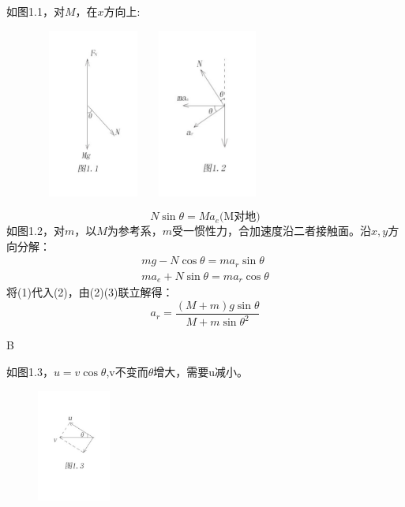 \documentclass[b5paper,opensource,sourcefont,parskip]{qyxf-book}
\begin{document}
\solve 如图1.1，对$M$，在$x$方向上:
\begin{figure}[htbp]
	\centering
	\includegraphics[width=10em,height=15em]{Chp1_illus1.png}
	\quad
	\centering
	\includegraphics[width=10em,height=15em]{Chp1_illus2.png}
\end{figure}
\begin{equation}
N\sin\theta=Ma_e\text{(M对地)}
\end{equation}
如图1.2，对$m$，以$M$为参考系，$m$受一惯性力，合加速度沿二者接触面。沿$x,y$方向分解：
\begin{gather}
mg-N\cos\theta=ma_r\sin\theta\\
ma_e+N\sin\theta=ma_r\cos\theta
\end{gather}
将(1)代入(2)，由(2)(3)联立解得：
\[a_r=\dfrac{(M+m)g\sin\theta}{M+m{\sin\theta}^2}\]


B

\solve 如图1.3，$u=v\cos\theta$,v不变而$\theta$增大，需要u减小。

\begin{figure}[htbp]
	\centering
	\includegraphics[width=6.5em,height=10em]{Chp1_illus3.png}
	\label{fig:Chp1_illus2}
\end{figure}
\end{document}
